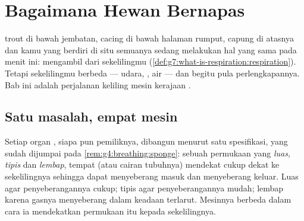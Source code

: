 \chapter{Bagaimana Hewan Bernapas}\label{ch:g7:how-animals-breathe}

 trout di bawah jembatan, cacing  di bawah halaman rumput,
capung di atasnya dan kamu yang berdiri di situ semuanya sedang
melakukan hal yang sama pada menit ini: mengambil  dari
sekelilingmu
(\cref{def:g7:what-is-respiration:respiration}). Tetapi sekelilingmu
berbeda --- udara, , air --- dan begitu pula perlengkapannya. Bab
ini adalah perjalanan keliling mesin  kerajaan .

\section{Satu masalah, empat mesin}

\begin{proposition}\label{prop:g7:how-animals-breathe:spec}
Setiap organ , siapa pun pemiliknya, dibangun menurut satu
spesifikasi, yang sudah dijumpai pada
\cref{rem:g4:breathing:sponge}: sebuah permukaan yang \emph{luas},
\emph{tipis} dan \emph{lembap}, tempat   (atau cairan
tubuhnya) mendekat cukup dekat ke sekelilingnya sehingga  dapat
menyeberang masuk dan  menyeberang keluar. Luas agar
penyeberangannya cukup; tipis agar penyeberangannya mudah; lembap
karena gasnya menyeberang dalam keadaan terlarut. Mesinnya berbeda
dalam cara ia mendekatkan permukaan itu kepada sekelilingnya.
\end{proposition}
\admitted

